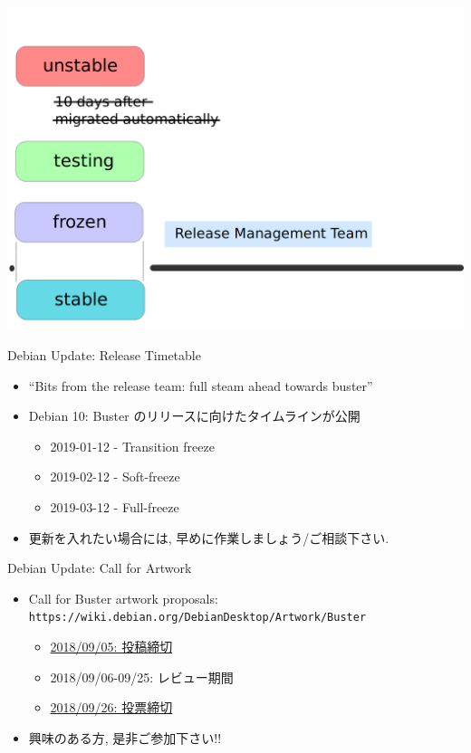 \documentclass[cjk,c,squeeze,shrink,dvipdfmx,12pt]{beamer}
\begin{document}
{%
  \begin{frame}
    \includegraphics[width=\paperwidth]{./image201011/Debian-Release-Cycle05.png}
  \end{frame}
}

\begin{frame}{Debian Update: Release Timetable}
  \begin{itemize}
  \item ``Bits from the release team: full steam ahead towards buster''
  \item Debian 10: Buster のリリースに向けたタイムラインが公開
    \begin{itemize}
    \item 2019-01-12 - Transition freeze
    \item 2019-02-12 - Soft-freeze
    \item 2019-03-12 - Full-freeze
    \end{itemize}
  \item \alert{更新を入れたい場合には, 早めに作業しましょう/ご相談下さい.}
  \end{itemize}
\end{frame}

\begin{frame}{Debian Update: Call for Artwork}
  \pause
  \begin{itemize}[<+->]
  \item Call for Buster artwork proposals:\\
    \texttt{https://wiki.debian.org/DebianDesktop/Artwork/Buster}
    \begin{itemize}
    \item %
      \underline{2018/09/05: 投稿締切}
    \item %
      2018/09/06-09/25: レビュー期間
    \item %
      \underline{2018/09/26: 投票締切}
    \end{itemize}
  \item 興味のある方, 是非ご参加下さい!!
  \end{itemize}
\end{frame}
\end{document}
